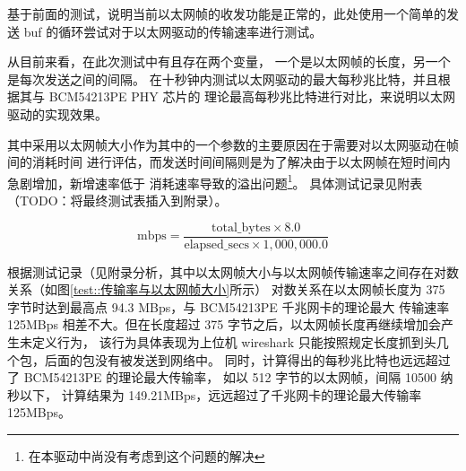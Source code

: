     基于前面的测试，说明当前以太网帧的收发功能是正常的，此处使用一个简单的发送 buf
    的循环尝试对于以太网驱动的传输速率进行测试。

    从目前来看，在此次测试中有且存在两个变量， 一个是以太网帧的长度，另一个是每次发送之间的间隔。
    在十秒钟内测试以太网驱动的最大每秒兆比特，并且根据其与 BCM54213PE PHY 芯片的
    理论最高每秒兆比特进行对比，来说明以太网驱动的实现效果。

    其中采用以太网帧大小作为其中的一个参数的主要原因在于需要对以太网驱动在帧间的消耗时间
    进行评估，而发送时间间隔则是为了解决由于以太网帧在短时间内急剧增加，新增速率低于
    消耗速率导致的溢出问题\footnote{在本驱动中尚没有考虑到这个问题的解决}。
    具体测试记录见附表（TODO：将最终测试表插入到附录）。

    $$\text{mbps} = \frac{\text{total\_bytes} \times 8.0}{\text{elapsed\_secs} \times 1,000,000.0}$$

    根据测试记录（见附录分析，其中以太网帧大小与以太网帧传输速率之间存在对数关系（如图\ref{test::传输率与以太网帧大小}所示）
    对数关系在以太网帧长度为 375 字节时达到最高点 94.3 MBps，与 BCM54213PE 千兆网卡的理论最大
    传输速率 125MBps 相差不大。但在长度超过 375 字节之后，以太网帧长度再继续增加会产生未定义行为，
    该行为具体表现为上位机 wireshark 只能按照规定长度抓到头几个包，后面的包没有被发送到网络中。
    同时，计算得出的每秒兆比特也远远超过了 BCM54213PE 的理论最大传输率，
    如以 512 字节的以太网帧，间隔 10500 纳秒以下，
    计算结果为 149.21MBps，远远超过了千兆网卡的理论最大传输率 125MBps。

        \label{test::传输率与以太网帧大小}

